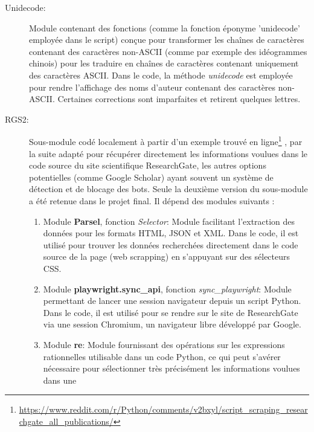 \documentclass{book}
\begin{document}
\begin{description}
    \item[Unidecode:] Module contenant des fonctions (comme la fonction éponyme
        'unidecode' employée dans le script) conçue pour transformer les chaînes de
        caractères contenant des caractères non-ASCII (comme par exemple des
        idéogrammes chinois) pour les traduire en chaînes de caractères contenant
        uniquement des caractères ASCII. Dans le code, la méthode \textit{unidecode}
        est employée pour rendre l'affichage des noms d'auteur contenant des caractères
        non-ASCII. Certaines corrections sont imparfaites et retirent quelques lettres.

    \item[RGS2:] Sous-module codé localement à partir d'un exemple trouvé en
        ligne\footnote{\url{https://www.reddit.com/r/Python/comments/v2bxyl/script_scraping_researchgate_all_publications/}}
        , par la suite adapté pour récupérer directement les informations
        voulues dans le code source du site scientifique ResearchGate, les autres
        options potentielles (comme Google Scholar) ayant souvent un système de
        détection et de blocage des bots. Seule la deuxième version du sous-module a
        été retenue dans le projet final. Il dépend des modules suivants :
        \begin{enumerate}
            \item Module \textbf{Parsel}, fonction \textit{Selector}: Module
                  facilitant l'extraction des données pour les formats HTML, JSON et XML. Dans le
                  code, il est utilisé pour trouver les données recherchées directement dans le
                  code source de la page (web scrapping) en s'appuyant sur des sélecteurs CSS.
                  \vspace{\baselineskip}
            \item Module \textbf{playwright.sync\_api}, fonction
                  \textit{sync\_playwright}: Module permettant de lancer une session navigateur
                  depuis un script Python. Dans le code, il est utilisé pour se rendre sur le
                  site de ResearchGate via une session Chromium, un navigateur libre développé
                  par Google.
                  \vspace{\baselineskip}
            \item Module \textbf{re}: Module fournissant des opérations sur les
                  expressions rationnelles utilisable dans un code Python, ce qui peut s'avérer
                  nécessaire pour sélectionner très précisément les informations voulues dans une

\end{enumerate}
\end{description}
\end{document}

